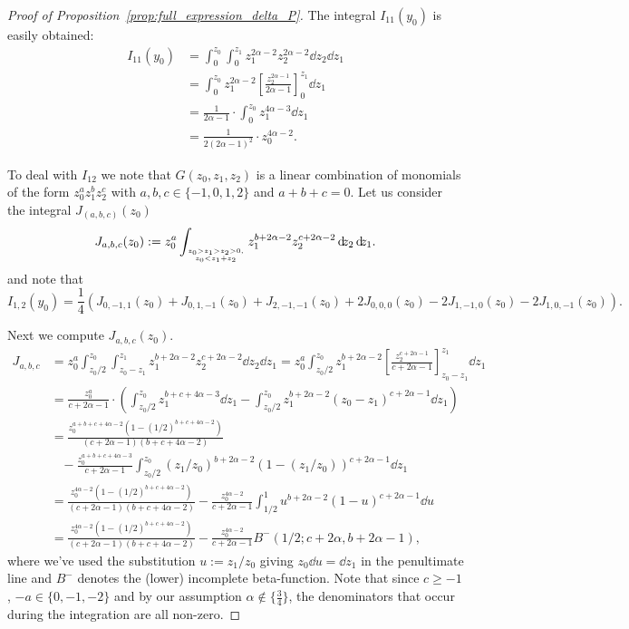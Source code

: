 \begin{proof}[Proof of Proposition~\ref{prop:full_expression_delta_P}]
The integral $I_{11}(y_0)$ is easily obtained:
\begin{align*}
	I_{11}(y_0) &= \int_0^{z_0} \int_0^{z_1} z_1^{2\alpha-2} z_2^{2\alpha-2} {\dd}z_2{\dd}z_1\\
	&= \int_0^{z_0} z_1^{2\alpha-2} \left[ \frac{z_2^{2\alpha-1}}{2\alpha-1} \right]_0^{z_1} {\dd}z_1\\
	&= \frac{1}{2\alpha-1} \cdot \int_0^{z_0} z_1^{4\alpha-3} {\dd}z_1 \\
	&= \frac{1}{2(2\alpha-1)^2} \cdot z_0^{4\alpha-2}.
\end{align*}

To deal with $I_{12}$ we note that $G(z_0,z_1,z_2)$ is a linear combination of monomials of the form $z_0^az_1^bz_2^c$ with 
$a,b,c \in \{-1,0,1,2\}$ and $a+b+c=0$. Let us consider the integral $J_(a,b,c)(z_0)$
\begin{equation}\label{eq:def_Delta_P_computation_int_J_1}
	J_{a,b,c}(z_0) := z_0^a \int_{{z_0>z_1>z_2>0,}\atop{z_0 < z_1+z_2}} z_1^{b+2\alpha-2} z_2^{c+2\alpha-2} {\operatorname{\, \mathrm{d}\hspace{-2pt}}}z_2{\operatorname{\, \mathrm{d}\hspace{-2pt}}}z_1.
\end{equation}
and note that
\begin{equation}\label{eq:Delta_P_computation_I12_with_J}
	I_{1,2}(y_0) = \frac{1}{4} (J_{0,-1,1}(z_0)+J_{0,1,-1}(z_0)+J_{2,-1,-1}(z_0)+2J_{0,0,0}(z_0)-2J_{1,-1,0}(z_0)-2J_{1,0,-1}(z_0)).
\end{equation}

Next we compute $J_{a,b,c}(z_0)$.
\begin{align*}
	J_{a,b,c} 
	&= z_0^a \int_{z_0/2}^{z_0}\int_{z_0-z_1}^{z_1} z_1^{b+2\alpha-2} z_2^{c+2\alpha-2} {\dd}z_2{\dd}z_1
		= z_0^a \int_{z_0/2}^{z_0} z_1^{b+2\alpha-2} \left[ \frac{ z_2^{c+2\alpha-1} }{ c+2\alpha-1 } \right]_{z_0-z_1}^{z_1} \dd z_1\\
	&= \frac{z_0^a}{c+2\alpha-1} \cdot \left( \int_{z_0/2}^{z_0} z_1^{b+c+4\alpha-3} \dd z_1
	   - \int_{z_0/2}^{z_0} z_1^{b+2\alpha-2} (z_0-z_1)^{c+2\alpha-1} {\dd}z_1 \right) \\
	&= \frac{z_0^{a+b+c+4\alpha-2}(1-(1/2)^{b+c+4\alpha-2})}{(c+2\alpha-1)(b+c+4\alpha-2)} \\
	&\hspace{10pt}- \frac{z_0^{a+b+c+4\alpha-3}}{c+2\alpha-1} \int_{z_0/2}^{z_0}  \left(z_1/z_0\right)^{b+2\alpha-2} 
	    \left(1-(z_1/z_0)\right)^{c+2\alpha-1} \dd z_1\\
	&= \frac{z_0^{4\alpha-2}(1-(1/2)^{b+c+4\alpha-2})}{(c+2\alpha-1)(b+c+4\alpha-2)} 
		- \frac{z_0^{4\alpha-2}}{c+2\alpha-1}
	   \int_{1/2}^1  u^{b+2\alpha-2}(1-u)^{c+2\alpha-1} \dd u \\
	&= \frac{z_0^{4\alpha-2}(1-(1/2)^{b+c+4\alpha-2})}{(c+2\alpha-1)(b+c+4\alpha-2)} 
		- \frac{z_0^{4\alpha-2}}{c+2\alpha-1} B^-(1/2;c+2\alpha, b+2\alpha-1),
\end{align*}
where we've used the substitution $u := z_1/z_0$ giving $z_0 {\dd} u = {\dd} z_1$ in the penultimate line and
$B^-$ denotes the (lower) incomplete beta-function. Note that since $c \geq -1$, $-a \in \{0,-1,-2\}$ and by our assumption $\alpha \not \in \{\frac{3}{4}\}$, the denominators that occur during the integration are all non-zero.


\end{proof}
